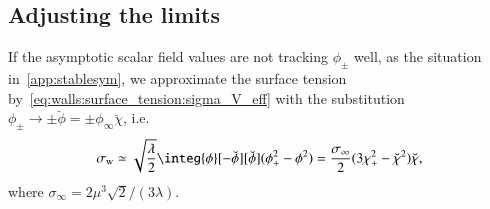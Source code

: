 \subsection{Adjusting the limits}\label{app:walls:surface_tension:new_limits}
    If the asymptotic scalar field values are not tracking $\phi_\pm$ well, as the situation in~\cref{app:stablesym}, we approximate the surface tension by~\cref{eq:walls:surface_tension:sigma_V_eff} with the substitution $\phi_\pm\to \pm \breve{\phi}= \pm\phi_\infty \breve{\chi}$, i.e.
    \begin{equation}
        \sigma\ped{w} \simeq %
        \sqrt{\frac{\lambda}{2}}\integ{\phi}[-\breve{\phi}][\breve{\phi}]  (\phi_+^2 - \phi^2)
        = \frac{\sigma_\infty}{2} (3\chi_+^2- \breve{\chi}^2)\breve{\chi},
    \end{equation}
    where $\sigma_\infty = 2\mu^3\sqrt{2}/(3\lambda)$.
